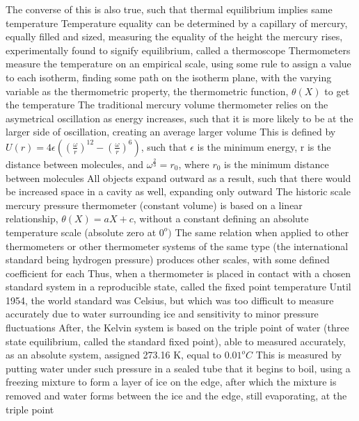 \documentclass[11 pt, twoside]{article}
\newenvironment{outline*}
{
	\begin{outline}[enumerate]
	}
	{\end{outline}
}
\begin{document}
\begin{outline*}
\3 The converse of this is also true, such that thermal equilibrium implies same temperature
\1 Temperature equality can be determined by a capillary of mercury, equally filled and sized, measuring the equality of the height the mercury rises, experimentally found to signify equilibrium, called a thermoscope
\2 Thermometers measure the temperature on an empirical scale, using some rule to assign a value to each isotherm, finding some path on the isotherm plane, with the varying variable as the thermometric property, the thermometric function, $\theta(X)$ to get the temperature
\3 The traditional mercury volume thermometer relies on the asymetrical oscillation as energy increases, such that it is more likely to be at the larger side of oscillation, creating an average larger volume
\4 This is defined by $U(r) = 4\epsilon((\frac{\omega}{r})^{12} - (\frac{\omega}{r})^6)$, such that $\epsilon$ is the minimum energy, r is the distance between molecules, and $\omega^{\frac{2}{3}} = r_0$, where $r_0$ is the minimum distance between molecules
\4 All objects expand outward as a result, such that there would be increased space in a cavity as well, expanding only outward
\2 The historic scale mercury pressure thermometer (constant volume) is based on a linear relationship, $\theta(X) = aX + c$, without a constant defining an absolute temperature scale (absolute zero at $0^o)$
\3 The same relation when applied to other thermometers or other thermometer systems of the same type (the international standard being hydrogen pressure) produces other scales, with some defined coefficient for each
\2 Thus, when a thermometer is placed in contact with a chosen standard system in a reproducible state, called the fixed point temperature
\3 Until 1954, the world standard was Celsius, but which was too difficult to measure accurately due to water surrounding ice and sensitivity to minor pressure fluctuations
\3 After, the Kelvin system is based on the triple point of water (three state equilibrium, called the standard fixed point), able to measured accurately, as an absolute system, assigned 273.16 K, equal to $0.01^o C$
\4 This is measured by putting water under such pressure in a sealed tube that it begins to boil, using a freezing mixture to form a layer of ice on the edge, after which the mixture is removed and water forms between the ice and the edge, still evaporating, at the triple point
\end{outline*}
\end{document}
